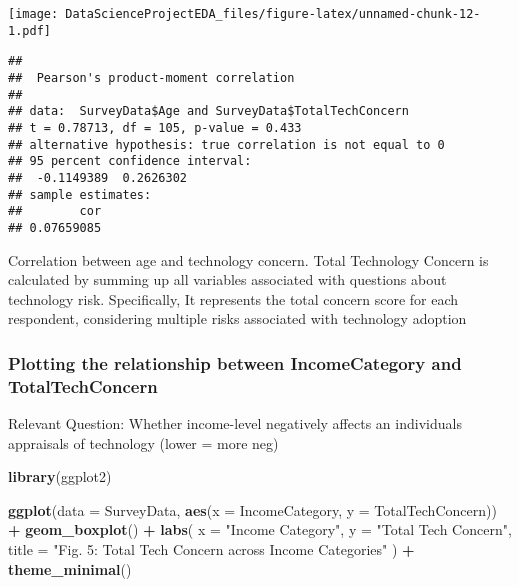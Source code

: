 \documentclass[
]{article}
\newenvironment{Shaded}{\begin{snugshade}}{\end{snugshade}}
\newcommand{\AttributeTok}[1]{\textcolor[rgb]{0.13,0.29,0.53}{#1}}
\newcommand{\CommentTok}[1]{\textcolor[rgb]{0.56,0.35,0.01}{\textit{#1}}}
\newcommand{\FunctionTok}[1]{\textcolor[rgb]{0.13,0.29,0.53}{\textbf{#1}}}
\newcommand{\NormalTok}[1]{#1}
\newcommand{\OtherTok}[1]{\textcolor[rgb]{0.56,0.35,0.01}{#1}}
\newcommand{\SpecialCharTok}[1]{\textcolor[rgb]{0.81,0.36,0.00}{\textbf{#1}}}
\newcommand{\StringTok}[1]{\textcolor[rgb]{0.31,0.60,0.02}{#1}}
\begin{document}
\texttt{[image: DataScienceProjectEDA\_files/figure-latex/unnamed-chunk-12-1.pdf]}

\begin{Shaded}
\end{Shaded}

\begin{verbatim}
## 
##  Pearson's product-moment correlation
## 
## data:  SurveyData$Age and SurveyData$TotalTechConcern
## t = 0.78713, df = 105, p-value = 0.433
## alternative hypothesis: true correlation is not equal to 0
## 95 percent confidence interval:
##  -0.1149389  0.2626302
## sample estimates:
##        cor 
## 0.07659085
\end{verbatim}

Correlation between age and technology concern. Total Technology Concern
is calculated by summing up all variables associated with questions
about technology risk. Specifically, It represents the total concern
score for each respondent, considering multiple risks associated with
technology adoption

\hypertarget{plotting-the-relationship-between-incomecategory-and-totaltechconcern}{%
\subsubsection{Plotting the relationship between IncomeCategory and
TotalTechConcern}\label{plotting-the-relationship-between-incomecategory-and-totaltechconcern}}

Relevant Question: Whether income-level negatively affects an
individuals appraisals of technology (lower = more neg)

\begin{Shaded}
\begin{Highlighting}[]
\FunctionTok{library}\NormalTok{(ggplot2)}

\FunctionTok{ggplot}\NormalTok{(}\AttributeTok{data =}\NormalTok{ SurveyData, }\FunctionTok{aes}\NormalTok{(}\AttributeTok{x =}\NormalTok{ IncomeCategory, }\AttributeTok{y =}\NormalTok{ TotalTechConcern)) }\SpecialCharTok{+}
  \FunctionTok{geom\_boxplot}\NormalTok{() }\SpecialCharTok{+}
  \FunctionTok{labs}\NormalTok{(}
    \AttributeTok{x =} \StringTok{"Income Category"}\NormalTok{, }\AttributeTok{y =} \StringTok{"Total Tech Concern"}\NormalTok{,}
    \AttributeTok{title =} \StringTok{"Fig. 5: Total Tech Concern across Income Categories"}
\NormalTok{  ) }\SpecialCharTok{+}
  \FunctionTok{theme\_minimal}\NormalTok{()}
\end{Highlighting}
\end{Shaded}
\end{document}
